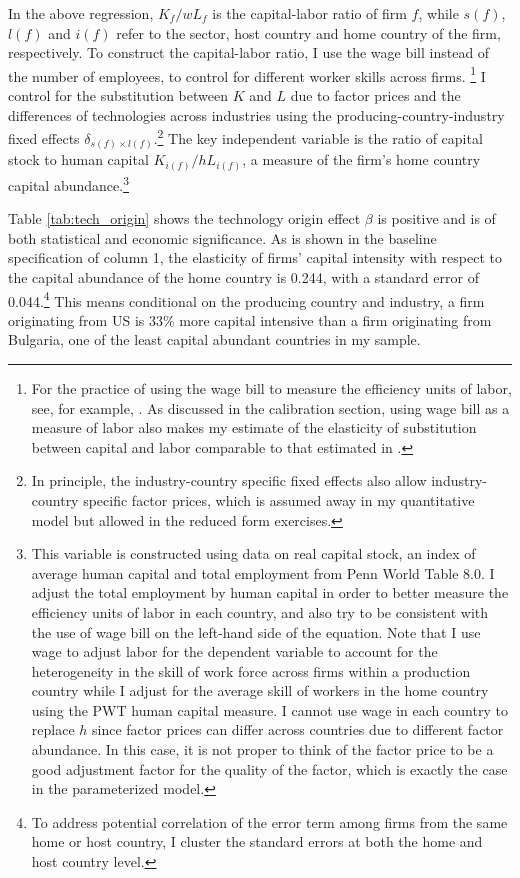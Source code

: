 \documentclass[notitlepage,11pt]{article}%
\begin{document}
In the above regression, $K_{f}/wL_{f}$ is the capital-labor ratio of firm
$f$, while $s\left(  f\right)  $, $l\left(  f\right)  $ and $i\left(
f\right)  $ refer to the sector, host country and home country of the firm,
respectively. To construct the capital-labor ratio, I use the wage bill
instead of the number of employees, to control for different worker skills
across firms. \footnote{For the practice of using the wage bill to measure the
efficiency units of labor, see, for example, \cite{hsieh_misallocation_2009}.
As discussed in the calibration section, using wage bill as a measure of labor
also makes my estimate of the elasticity of substitution between capital and
labor comparable to that estimated in \cite{oberfield_micro_2014}.} I control
for the substitution between $K$ and $L$ due to factor prices and the
differences of technologies across industries using the
producing-country-industry fixed effects $\delta_{s\left(  f\right)  \times
l\left(  f\right)  }$.\footnote{In principle, the industry-country specific
fixed effects also allow industry-country specific factor prices, which is
assumed away in my quantitative model but allowed in the reduced form
exercises.} The key independent variable is the ratio of capital stock to
human capital $K_{i\left(  f\right)  }/hL_{i\left(  f\right)  }$, a measure of
the firm's home country capital abundance.\footnote{This variable is
constructed using data on real capital stock, an index of average human
capital and total employment from Penn World Table 8.0. I adjust the total
employment by human capital in order to better measure the efficiency units of
labor in each country, and also try to be consistent with the use of wage bill
on the left-hand side of the equation. Note that I use wage to adjust labor
for the dependent variable to account for the heterogeneity in the skill of
work force across firms within a production country while I adjust for the
average skill of workers in the home country using the PWT human capital
measure. I cannot use wage in each country to replace $h$ since factor prices
can differ across countries due to different factor abundance. In this case,
it is not proper to think of the factor price to be a good adjustment factor
for the quality of the factor, which is exactly the case in the parameterized
model.}%

%


Table \ref{tab:tech_origin} shows the technology origin effect $\beta$ is
positive and is of both statistical and economic significance. As is shown in
the baseline specification of column 1, the elasticity of firms' capital
intensity with respect to the capital abundance of the home country is 0.244,
with a standard error of 0.044.\footnote{To address potential correlation of
the error term among firms from the same home or host country, I cluster the
standard errors at both the home and host country level.} This means
conditional on the producing country and industry, a firm originating from US
is 33\% more capital intensive than a firm originating from Bulgaria, one of
the least capital abundant countries in my sample.
\end{document}
